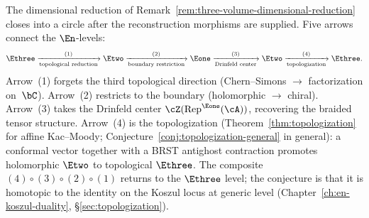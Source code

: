 \begin{remark}
\label{rem:en-circle-intro}
%
The dimensional reduction of
Remark~\ref{rem:three-volume-dimensional-reduction} closes into a
circle after the reconstruction morphisms are supplied. Five arrows connect
the $\En$-levels:
\[
\Ethree
 \xrightarrow[\text{topological reduction}]{\;\;(1)\;\;}
\Etwo
 \xrightarrow[\text{boundary restriction}]{\;\;(2)\;\;}
\Eone
 \xrightarrow[\text{Drinfeld center}]{\;\;(3)\;\;}
\Etwo
 \xrightarrow[\text{topologization}]{\;\;(4)\;\;}
\Ethree.
\]
Arrow~(1) forgets the third topological direction (Chern--Simons
$\to$ factorization on~$\bC$). Arrow~(2) restricts to the
boundary (holomorphic $\to$ chiral). Arrow~(3) takes the Drinfeld
center $\cZ(\mathrm{Rep}^{\Eone}(\cA))$, recovering the braided
tensor structure. Arrow~(4) is the topologization
(Theorem~\ref{thm:topologization} for affine Kac--Moody;
Conjecture~\ref{conj:topologization-general} in general):
a conformal vector together with a BRST antighost contraction
promotes holomorphic $\Etwo$ to topological $\Ethree$. The composite
$(4) \circ (3) \circ (2) \circ (1)$ returns to the $\Ethree$
level; the conjecture is that it is homotopic to the identity
on the Koszul locus at generic level
(Chapter~\ref{ch:en-koszul-duality},
\S\ref{sec:topologization}).
\end{remark}

